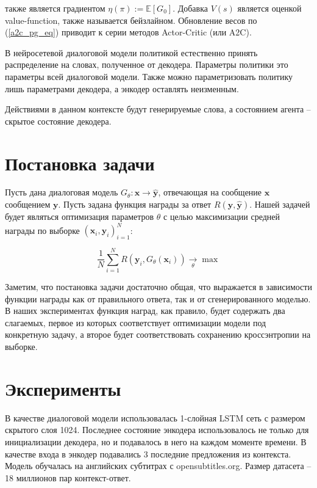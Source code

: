 \documentclass[]{article}
\begin{document}
также является градиентом $\eta(\pi) := \mathbb{E}[G_0]$. Добавка $V(s)$ является оценкой value-function, также называется бейзлайном. Обновление весов по (\ref{a2c_pg_eq}) приводит к серии методов Actor-Critic (или A2C).

В нейросетевой диалоговой модели политикой естественно принять распределение на словах, полученное от декодера. Параметры политики это параметры всей диалоговой модели. Также можно параметризовать политику лишь параметрами декодера, а энкодер оставлять неизменным.

Действиями в данном контексте будут генерируемые слова, а состоянием агента -- скрытое состояние декодера.

\section{Постановка задачи}

Пусть дана диалоговая модель $G_{\theta}: \mathbf{x} \rightarrow \hat{\mathbf{y}}$, отвечающая на сообщение $\mathbf{x}$ сообщением $\mathbf{y}$. Пусть задана функция награды за ответ $R(\mathbf{y}, \hat{\mathbf{y}})$. Нашей задачей будет являться оптимизация параметров $\theta$ с целью максимизации средней награды по выборке $(\mathbf{x}_i, \mathbf{y}_i)_{i=1}^N$:

\begin{equation}
\label{problem_optimize_reward}
\frac{1}{N}\sum_{i=1}^N R(\mathbf{y}_i, G_{\theta}(\mathbf{x}_i)) \xrightarrow[\theta]{} \max
\end{equation}

Заметим, что постановка задачи достаточно общая, что выражается в зависимости функции награды как от правильного ответа, так и от сгенерированного моделью. В наших экспериментах функция наград, как правило, будет содержать два слагаемых, первое из которых соответствует оптимизации модели под конкретную задачу, а второе будет соответствовать сохранению кроссэнтропии на выборке.
\section{Эксперименты}

В качестве диалоговой модели использовалась 1-слойная LSTM сеть с размером скрытого слоя 1024. Последнее состояние энкодера использовалось не только для инициализации декодера, но и подавалось в него на каждом моменте времени. В качестве входа в энкодер подавались 3 последние предложения из контекста. Модель обучалась на английских субтитрах с opensubtitles.org. Размер датасета -- 18 миллионов пар контекст-ответ.
\end{document}
